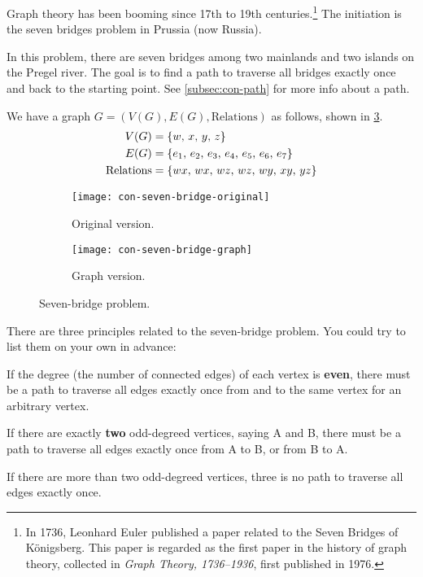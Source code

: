\documentclass[../src/handouts/main.tex]{subfiles}
\begin{document}
Graph theory has been booming since 17th to 19th centuries.\footnote{In 1736, Leonhard Euler published a paper related to the Seven Bridges of Königsberg. This paper is regarded as the first paper in the history of graph theory, collected in \textit{Graph Theory, 1736--1936}, first published in 1976.} The initiation is the seven bridges problem in Prussia (now Russia).

In this problem, there are seven bridges among two mainlands and two islands on the Pregel river. The goal is to find a path to traverse all bridges exactly once and back to the starting point. See \cref{subsec:con-path} for more info about a path.

We have a graph $G = (V(G), E(G), \text{Relations})$ as follows, shown in \cref{fig:con-seven-bridge}.
\begin{align*}
  V(G)             & = \{ w,\, x,\, y,\, z \}                        \\
  E(G)             & = \{ \foreach \i in {1,...,6} {e_\i,\, } e_7 \} \\
  \text{Relations} & = \{ wx,\, wx,\, wz,\, wz,\, wy,\, xy,\, yz \}
\end{align*}

\begin{figure}[htbp]
  \centering
  \begin{subfigure}{0.35\textwidth}
    \centering
    \texttt{[image: con-seven-bridge-original]}
    \caption{Original version.}
    \label{fig:con-seven-bridge-original}
  \end{subfigure}
  \hspace{.1\textwidth}
  \begin{subfigure}{0.25\textwidth}
    \centering
    \texttt{[image: con-seven-bridge-graph]}
    \caption{Graph version.}
    \label{fig:con-seven-bridge-graph}
  \end{subfigure}
  \caption{Seven-bridge problem.}
  \label{fig:con-seven-bridge}
\end{figure}

There are three principles related to the seven-bridge problem. You could try to list them on your own in advance:
\begin{enumerate*}
  \item If the degree (the number of connected edges) of each vertex is \textbf{even}, there must be a path to traverse all edges exactly once from and to the same vertex for an arbitrary vertex.
  \item If there are exactly \textbf{two} odd-degreed vertices, saying A and B, there must be a path to traverse all edges exactly once from A to B, or from B to A.
  \item If there are more than two odd-degreed vertices, three is no path to traverse all edges exactly once.
\end{enumerate*}
\end{document}
